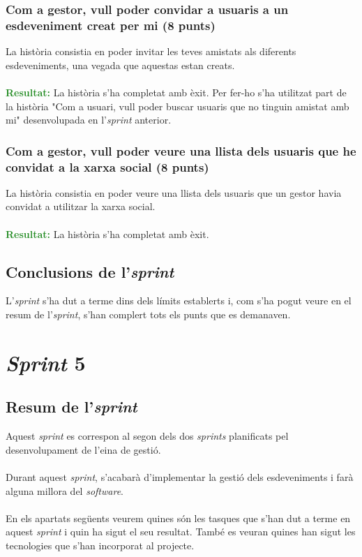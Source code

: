 \documentclass[11pt,catalan,listoffigures,listoftables]{tfgetsinf}
\begin{document}
\subsubsection{Com a gestor, vull poder convidar a usuaris a un esdeveniment creat per mi (8 punts)}

La història consistia en poder invitar les teves amistats als diferents esdeveniments, una vegada que aquestas estan creats.\\ \\
\textcolor{forestgreen}{\textbf{Resultat:}} La història s'ha completat amb èxit. Per fer-ho s'ha utilitzat part de la història "Com a usuari, vull poder buscar usuaris que no tinguin amistat amb mi" desenvolupada en l'\textit{sprint} anterior.

\subsubsection{Com a gestor, vull poder veure una llista dels usuaris que he convidat a la xarxa social (8 punts)}

La història consistia en poder veure una llista dels usuaris que un gestor havia convidat a utilitzar la xarxa social.\\ \\
\textcolor{forestgreen}{\textbf{Resultat:}} La història s'ha completat amb èxit.

\subsection{Conclusions de l'\textit{sprint}}

L'\textit{sprint} s'ha dut a terme dins dels límits establerts i, com s'ha pogut veure en el resum de l'\textit{sprint}, s'han complert tots els punts que es demanaven.

\section{\textit{Sprint} 5}

\subsection{Resum de l'\textit{sprint}}

Aquest \textit{sprint} es correspon al segon dels dos \textit{sprints} planificats pel desenvolupament de l'eina de gestió.\\ \\
Durant aquest \textit{sprint}, s'acabarà d'implementar la gestió dels esdeveniments i farà alguna millora del \textit{software}.\\ \\
En els apartats següents veurem quines són les tasques que s'han dut a terme en aquest \textit{sprint} i quin ha sigut el seu resultat. També es veuran quines han sigut les tecnologies que s'han incorporat al projecte.
\end{document}
